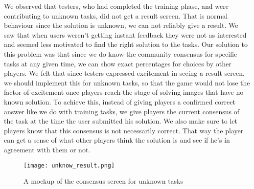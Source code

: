 We observed that testers, who had completed the training phase, and were contributing to unknown tasks, did not get a result screen. That is normal behaviour since the solution is unknown, we can not reliably give a result. We saw that when users weren't getting instant feedback they were not as interested and seemed less motivated to find the right solution to the tasks. Our solution to this problem was that since we do know the community consensus for specific tasks at any given time, we can show exact percentages for choices by other players. We felt that since testers expressed excitement in seeing a result screen, we should implement this for unknown tasks, so that the game would not lose the factor of excitement once players reach the stage of solving images that have no known solution. To achieve this, instead of giving players a confirmed correct answer like we do with training tasks, we give players the current consensus of the task at the time the user submitted his solution. We also make sure to let players know that this consensus is not necessarily correct. That way the player can get a sense of what other players think the solution is and see if he's in agreement with them or not.

\begin{figure}[H]
	\centering
	\graphicspath{ {./graphics/} }
    \centerline{\texttt{[image: unknow\_result.png]}}
    \caption{\label{fig:bdchart}A mockup of the consensus screen for unknown tasks}
\end{figure}